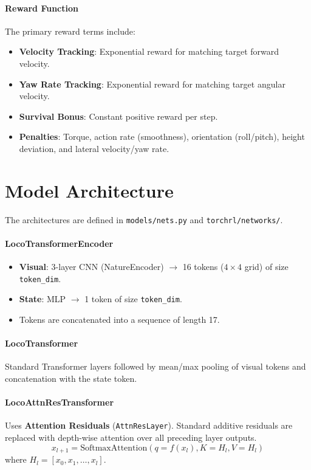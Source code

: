 \documentclass{article}
\begin{document}
\paragraph{Reward Function}
The primary reward terms include:
\begin{itemize}
    \item \textbf{Velocity Tracking}: Exponential reward for matching target forward velocity.
    \item \textbf{Yaw Rate Tracking}: Exponential reward for matching target angular velocity.
    \item \textbf{Survival Bonus}: Constant positive reward per step.
    \item \textbf{Penalties}: Torque, action rate (smoothness), orientation (roll/pitch), height deviation, and lateral velocity/yaw rate.
\end{itemize}

\section{Model Architecture}
The architectures are defined in \texttt{models/nets.py} and \texttt{torchrl/networks/}.

\paragraph{LocoTransformerEncoder}
\begin{itemize}
    \item \textbf{Visual}: 3-layer CNN (NatureEncoder) $\to$ 16 tokens ($4 \times 4$ grid) of size \texttt{token_dim}.
    \item \textbf{State}: MLP $\to$ 1 token of size \texttt{token_dim}.
    \item Tokens are concatenated into a sequence of length 17.
\end{itemize}

\paragraph{LocoTransformer}
Standard Transformer layers followed by mean/max pooling of visual tokens and concatenation with the state token.

\paragraph{LocoAttnResTransformer}
Uses \textbf{Attention Residuals} (\texttt{AttnResLayer}). Standard additive residuals are replaced with depth-wise attention over all preceding layer outputs.
\[ x_{l+1} = \text{SoftmaxAttention}(q=f(x_l), K=H_l, V=H_l) \]
where $H_l = [x_0, x_1, \dots, x_l]$.
\end{document}
